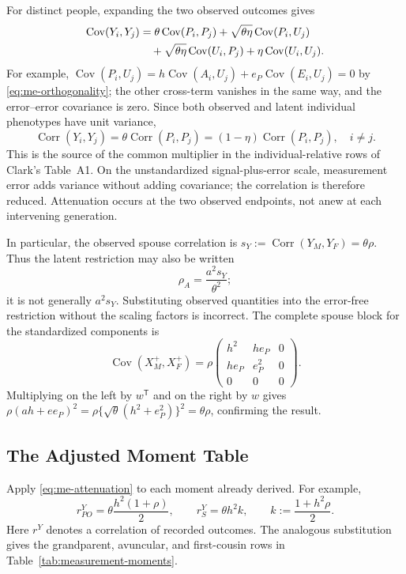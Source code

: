 For distinct people, expanding the two observed outcomes gives
\begin{align}
 \operatorname{Cov}(Y_i,Y_j)
 &=\theta\operatorname{Cov}(P_i,P_j)
   +\sqrt{\theta\eta}\operatorname{Cov}(P_i,U_j)\notag\\
 &\quad+\sqrt{\theta\eta}\operatorname{Cov}(U_i,P_j)
   +\eta\operatorname{Cov}(U_i,U_j).
 \label{eq:me-expansion}
\end{align}
For example,
$\operatorname{Cov}(P_i,U_j)
=h\operatorname{Cov}(A_i,U_j)+e_P\operatorname{Cov}(E_i,U_j)=0$
by \eqref{eq:me-orthogonality}; the other cross-term vanishes in the
same way, and the error--error covariance is zero. Since both observed
and latent individual phenotypes have unit variance,
\begin{equation}
 \boxed{\operatorname{Corr}(Y_i,Y_j)
   =\theta\operatorname{Corr}(P_i,P_j)
   =(1-\eta)\operatorname{Corr}(P_i,P_j),\quad i\ne j.}
 \label{eq:me-attenuation}
\end{equation}
This is the source of the common multiplier in the individual-relative
rows of Clark's Table~A1. On the unstandardized signal-plus-error scale,
measurement error adds variance without adding covariance; the
correlation is therefore reduced. Attenuation occurs at the two observed
endpoints, not anew at each intervening generation.

In particular, the observed spouse correlation is
$s_Y:=\operatorname{Corr}(Y_M,Y_F)=\theta\rho$. Thus the latent
restriction may also be written
\[
 \rho_A=\frac{a^2s_Y}{\theta^2};
\]
it is not generally $a^2s_Y$. Substituting observed quantities into the
error-free restriction without the scaling factors is incorrect.
The complete spouse block for the standardized components is
\[
 \operatorname{Cov}(X_M^+,X_F^+)
 =\rho\begin{pmatrix}
 h^2&he_P&0\\he_P&e_P^2&0\\0&0&0
 \end{pmatrix}.
\]
Multiplying on the left by $w^{\mathsf T}$ and on the right by $w$
gives $\rho(ah+ee_P)^2
=\rho\{\sqrt{\theta}(h^2+e_P^2)\}^2=\theta\rho$, confirming the result.

\subsection{The Adjusted Moment Table}
\label{sec:me-table}

Apply \eqref{eq:me-attenuation} to each moment already derived. For
example,
\[
 r_{PO}^{Y}=\theta\frac{h^2(1+\rho)}{2},\qquad
 r_S^{Y}=\theta h^2k,\qquad
 k:=\frac{1+h^2\rho}{2}.
\]
Here $r^Y$ denotes a correlation of recorded outcomes. The analogous
substitution gives the grandparent, avuncular, and first-cousin rows
in Table~\ref{tab:measurement-moments}.

